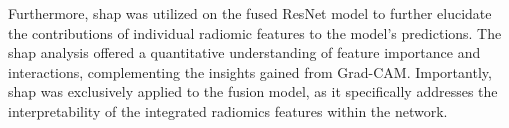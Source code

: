 Furthermore, \ac{shap} was utilized on the fused ResNet model to further elucidate the contributions of individual radiomic features to the model's predictions. The \ac{shap} analysis offered a quantitative understanding of feature importance and interactions, complementing the insights gained from Grad-CAM. Importantly, \ac{shap} was exclusively applied to the fusion model, as it specifically addresses the interpretability of the integrated radiomics features within the network.
    

